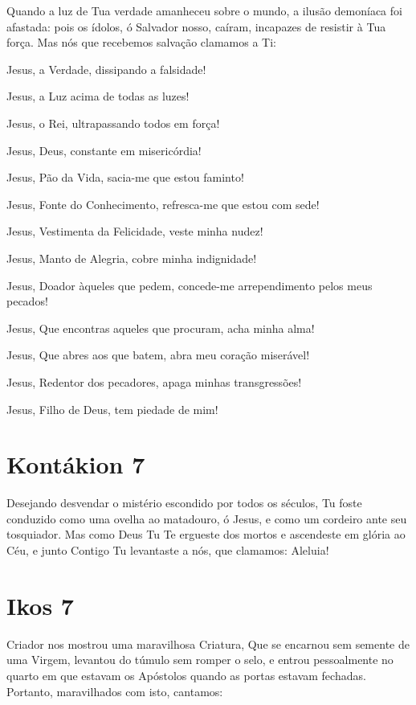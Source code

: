 \documentclass{subfiles}
\begin{document}
Quando a luz de Tua verdade amanheceu sobre o mundo, a ilusão
demoníaca foi afastada: pois os ídolos, ó Salvador nosso, caíram, incapazes de
resistir à Tua força. Mas nós que recebemos salvação clamamos a Ti:

\begin{hangparas}{1em}{1}
Jesus, a Verdade, dissipando a falsidade! \par
\setlength{\parskip}{0em}
Jesus, a Luz acima de todas as luzes! \par
Jesus, o Rei, ultrapassando todos em força! \par
Jesus, Deus, constante em misericórdia! \par
Jesus, Pão da Vida, sacia-me que estou faminto! \par
Jesus, Fonte do Conhecimento, refresca-me que estou com sede! \par
Jesus, Vestimenta da Felicidade, veste minha nudez! \par
Jesus, Manto de Alegria, cobre minha indignidade! \par
Jesus, Doador àqueles que pedem, concede-me arrependimento pelos meus pecados! \par
Jesus, Que encontras aqueles que procuram, acha minha alma! \par
Jesus, Que abres aos que batem, abra meu coração miserável! \par
Jesus, Redentor dos pecadores, apaga minhas transgressões! \par
Jesus, Filho de Deus, tem piedade de mim!
\end{hangparas}

\section{Kontákion 7}

Desejando desvendar o mistério escondido por todos os séculos, Tu
foste conduzido como uma ovelha ao matadouro, ó Jesus, e como um cordeiro
ante seu tosquiador. Mas como Deus Tu Te ergueste dos mortos e ascendeste
em glória ao Céu, e junto Contigo Tu levantaste a nós, que clamamos: Aleluia!

\section{Ikos 7}

Criador nos mostrou uma maravilhosa Criatura, Que se encarnou sem
semente de uma Virgem, levantou do túmulo sem romper o selo, e entrou
pessoalmente no quarto em que estavam os Apóstolos quando as portas
estavam fechadas. Portanto, maravilhados com isto, cantamos:
\end{document}
